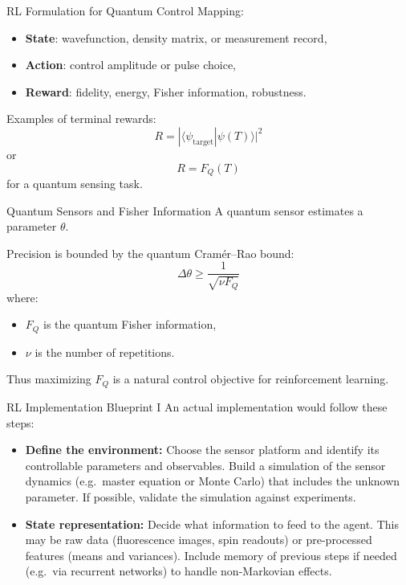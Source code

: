 \documentclass[aspectratio=169]{beamer}
\begin{document}
\begin{frame}{RL Formulation for Quantum Control}
  Mapping:
  \begin{itemize}
  \item \textbf{State}: wavefunction, density matrix, or measurement record,
  \item \textbf{Action}: control amplitude or pulse choice,
  \item \textbf{Reward}: fidelity, energy, Fisher information, robustness.
  \end{itemize}

  Examples of terminal rewards:
  \[
  R = |\langle \psi_{\mathrm{target}}|\psi(T)\rangle|^2
  \]
  or
  \[
  R = F_Q(T)
  \]
  for a quantum sensing task.
\end{frame}

\begin{frame}{Quantum Sensors and Fisher Information}
  A quantum sensor estimates a parameter $\theta$.

  Precision is bounded by the quantum Cram\'er--Rao bound:
  \[
  \Delta \theta \ge \frac{1}{\sqrt{\nu F_Q}}
  \]
  where:
  \begin{itemize}
  \item $F_Q$ is the quantum Fisher information,
  \item $\nu$ is the number of repetitions.
  \end{itemize}

  Thus maximizing $F_Q$ is a natural control objective for reinforcement learning.
\end{frame}

\begin{frame}{RL Implementation Blueprint I}
An actual implementation would follow these steps:
\begin{itemize}
  \item {\bf Define the environment:} Choose the sensor platform and identify its controllable parameters and observables.  Build a simulation of the sensor dynamics (e.g.\ master equation or Monte Carlo) that includes the unknown parameter. If possible, validate the simulation against experiments.
  \item {\bf State representation:} Decide what information to feed to the agent.  This may be raw data (fluorescence images, spin readouts) or pre-processed features (means and variances). Include memory of previous steps if needed (e.g.\ via recurrent networks) to handle non-Markovian effects.
\end{itemize}
\end{frame}
\end{document}
